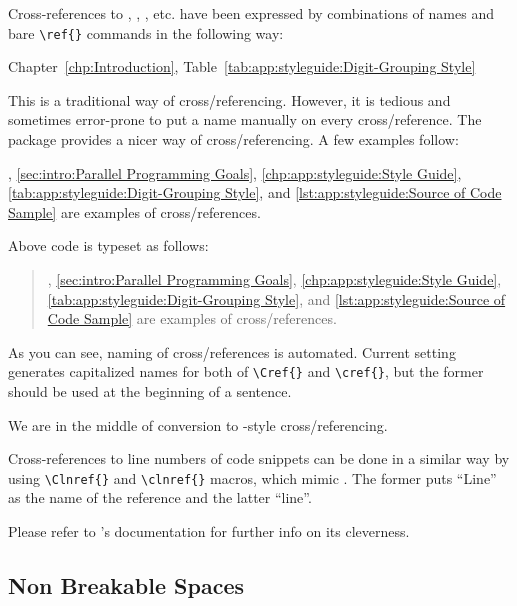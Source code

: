 Cross-references to ,
,
, etc. have
been expressed by combinations of names and bare \verb|\ref{}|
commands in the following way:

\begin{VerbatimN}
Chapter~\ref{chp:Introduction},
Table~\ref{tab:app:styleguide:Digit-Grouping Style}
\end{VerbatimN}

This is a traditional way of cross\-/referencing.
However, it is tedious and sometimes error-prone to put a name
manually on every cross\-/reference.
The  package provides a nicer way of cross\-/referencing.
A few examples follow:

\begin{VerbatimN}
,
\cref{sec:intro:Parallel Programming Goals},
\cref{chp:app:styleguide:Style Guide},
\cref{tab:app:styleguide:Digit-Grouping Style}, and
\cref{lst:app:styleguide:Source of Code Sample} are
examples of cross\-/references.
\end{VerbatimN}

Above code is typeset as follows:

\begin{quote}
,
\cref{sec:intro:Parallel Programming Goals},
\cref{chp:app:styleguide:Style Guide},
\cref{tab:app:styleguide:Digit-Grouping Style}, and
\cref{lst:app:styleguide:Source of Code Sample} are
examples of cross\-/references.
\end{quote}

As you can see, naming of cross\-/references is automated.
Current setting generates capitalized names for both of
\verb|\Cref{}| and \verb|\cref{}|, but the former
should be used at the beginning of a sentence.

We are in the middle of conversion to
-style cross\-/referencing.

Cross-references to line numbers of code snippets
can be done in a similar way by using \verb|\Clnref{}| and
\verb|\clnref{}| macros, which mimic .
The former puts ``Line'' as the name of the reference
and the latter ``line''.

Please refer to 's documentation for further
info on its cleverness.

\subsection{Non Breakable Spaces}
\label{sec:app:styleguide:Non Breakable Spaces}


